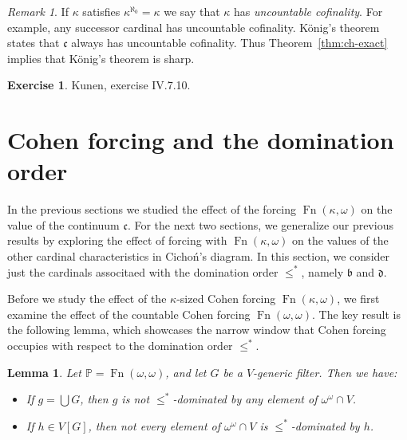 \documentclass[11pt,oneside]{amsbook}
\newcommand{\PP}{\mathbb P}
\DeclareMathOperator{\Fn}{Fn}
\theoremstyle{definition}
\newtheorem{exerc}{Exercise}[section]
\theoremstyle{plain}
\newtheorem{lemma}[theorem]{Lemma}
\theoremstyle{definition}
\theoremstyle{remark}
\newtheorem{remark}[theorem]{Remark}
\numberwithin{equation}{section}
\numberwithin{figure}{section}
\begin{document}
\begin{remark}
  If $\kappa$ satisfies $\kappa^{\aleph_0}=\kappa$ we say that $\kappa$ has \emph{uncountable cofinality}. For example, any successor cardinal has uncountable cofinality. K\"onig's theorem states that $\mathfrak c$ always has uncountable cofinality. Thus Theorem~\ref{thm:ch-exact} implies that K\"onig's theorem is sharp.
\end{remark}

\begin{exerc}
  Kunen, exercise IV.7.10.
\end{exerc}


\newpage
\section{Cohen forcing and the domination order}

In the previous sections we studied the effect of the forcing $\Fn(\kappa,\omega)$ on the value of the continuum $\mathfrak c$. For the next two sections, we generalize our previous results by exploring the effect of forcing with $\Fn(\kappa,\omega)$ on the values of the other cardinal characteristics in Cicho\'n's diagram. In this section, we consider just the cardinals associtaed with the domination order $\leq^*$, namely $\mathfrak b$ and $\mathfrak d$.

Before we study the effect of the $\kappa$-sized Cohen forcing $\Fn(\kappa,\omega)$, we first examine the effect of the countable Cohen forcing $\Fn(\omega,\omega)$. The key result is the following lemma, which showcases the narrow window that Cohen forcing occupies with respect to the domination order $\leq^*$.

\begin{lemma}
  \label{lem:cohen-dominating}
  Let $\PP=\Fn(\omega,\omega)$, and let $G$ be a $V$-generic filter. Then we have:
  \begin{itemize}
  \item If $g=\bigcup G$, then $g$ is not $\leq^*$-dominated by any element of $\omega^\omega\cap V$.
  \item If $h\in V[G]$, then not every element of $\omega^\omega\cap V$ is $\leq^*$-dominated by $h$.
  \end{itemize}
\end{lemma}
\end{document}
